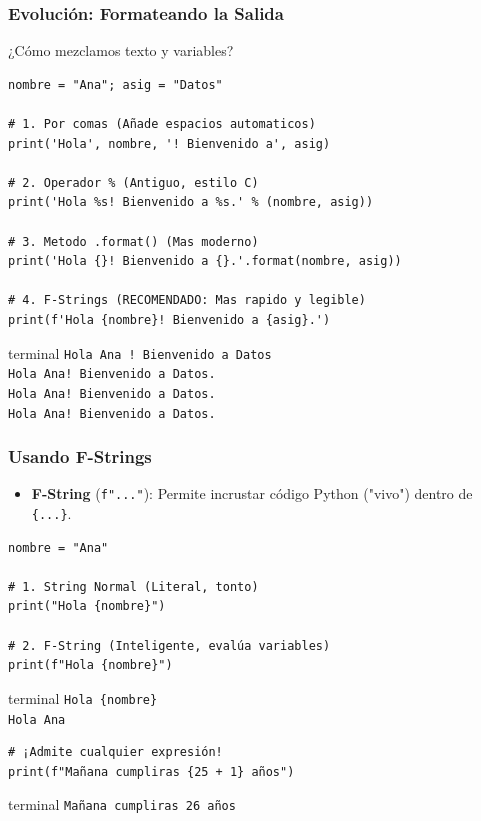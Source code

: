 \documentclass[11pt]{beamer}
\newcommand{\terminal}[1]{
    \vspace{-0.2em}
    \begin{beamercolorbox}[wd=\linewidth, sep=0.3em, rounded=false, shadow=false]{terminal}
    \texttt{#1}
    \end{beamercolorbox}
    \vspace{0.2em}
}
\begin{document}
\begin{frame}[fragile]\frametitle{Evolución: Formateando la Salida}
¿Cómo mezclamos texto y variables?
\begin{lstlisting}[basicstyle=\tiny]
nombre = "Ana"; asig = "Datos"

# 1. Por comas (Añade espacios automaticos)
print('Hola', nombre, '! Bienvenido a', asig)

# 2. Operador % (Antiguo, estilo C)
print('Hola %s! Bienvenido a %s.' % (nombre, asig))

# 3. Metodo .format() (Mas moderno)
print('Hola {}! Bienvenido a {}.'.format(nombre, asig))

# 4. F-Strings (RECOMENDADO: Mas rapido y legible)
print(f'Hola {nombre}! Bienvenido a {asig}.')
\end{lstlisting}
\terminal{Hola Ana ! Bienvenido a Datos\\Hola Ana! Bienvenido a Datos.\\Hola Ana! Bienvenido a Datos.\\Hola Ana! Bienvenido a Datos.}
\end{frame}

\begin{frame}[fragile]\frametitle{Usando F-Strings}
\begin{itemize}
    \item \textbf{F-String} (\lstinline|f"..."|): Permite incrustar código Python ("vivo") dentro de \lstinline|{...}|.
\end{itemize}
\begin{lstlisting}[basicstyle=\scriptsize]
nombre = "Ana"

# 1. String Normal (Literal, tonto)
print("Hola {nombre}") 

# 2. F-String (Inteligente, evalúa variables)
print(f"Hola {nombre}")
\end{lstlisting}
\terminal{Hola \{nombre\}\\Hola Ana}

\begin{lstlisting}[basicstyle=\scriptsize]
# ¡Admite cualquier expresión!
print(f"Mañana cumpliras {25 + 1} años")
\end{lstlisting}
\terminal{Mañana cumpliras 26 años}
\end{frame}
\end{document}
